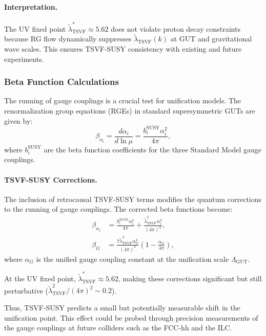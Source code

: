 \documentclass[twocolumn,superscriptaddress,floatfix]{revtex4-2}
\begin{document}
\paragraph{Interpretation.}
The UV fixed point $\tilde{\lambda}_{\text{TSVF}}^* \approx 5.62$ does not violate proton decay constraints because RG flow dynamically suppresses $\tilde{\lambda}_{\text{TSVF}}(k)$ at GUT and gravitational wave scales.  
This ensures TSVF-SUSY consistency with existing and future experiments.
\subsubsection{Beta Function Calculations}
\label{subsec:calculations}

The running of gauge couplings is a crucial test for unification models. The renormalization group equations (RGEs) in standard supersymmetric GUTs are given by:
\begin{equation}
\beta_{\alpha_i} = \frac{d\alpha_i}{d\ln\mu} = \frac{b_i^{\text{SUSY}}\alpha_i^2}{4\pi},
\label{eq:beta_susy}
\end{equation}
where $b_i^{\text{SUSY}}$ are the beta function coefficients for the three Standard Model gauge couplings.

\paragraph{TSVF-SUSY Corrections.} 
The inclusion of retrocausal TSVF-SUSY terms modifies the quantum corrections to the running of gauge couplings. The corrected beta functions become:
\begin{align}
\beta_{\alpha_i} &= \frac{b_i^{\text{SUSY}}\alpha_i^2}{4\pi} + \frac{\tilde{\lambda}_{\text{TSVF}}^2 \alpha_i^3}{(4\pi)^3}, 
\label{eq:beta_alpha_corrected} \\
\beta_G &= \frac{7 \tilde{\lambda}_{\text{TSVF}}^2 \alpha_G^3}{(4\pi)^3} \left(1 - \frac{\alpha_G}{4\pi}\right),
\label{eq:beta_G_corrected}
\end{align}
where $\alpha_G$ is the unified gauge coupling constant at the unification scale $\Lambda_{\text{GUT}}$.

At the UV fixed point, $\tilde{\lambda}_{\text{TSVF}}^* \approx 5.62$, making these corrections significant but still perturbative ($\tilde{\lambda}_{\text{TSVF}}^2/(4\pi)^2 \sim 0.2$).

Thus, TSVF-SUSY predicts a small but potentially measurable shift in the unification point. This effect could be probed through precision measurements of the gauge couplings at future colliders such as the FCC-hh and the ILC.
\end{document}
